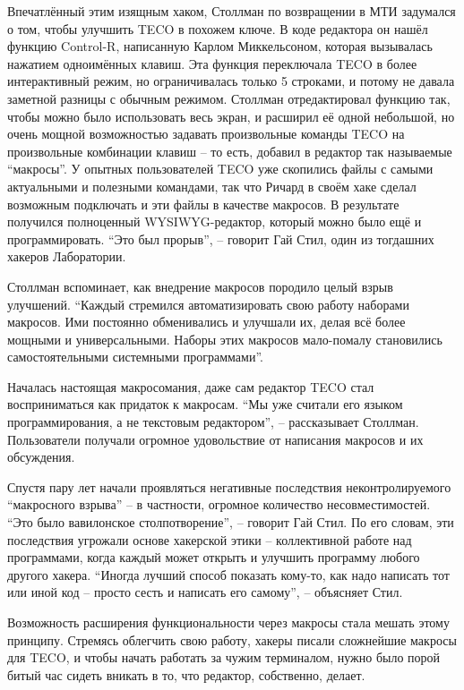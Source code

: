 Впечатлённый этим изящным хаком, Столлман по возвращении в МТИ задумался о том, чтобы улучшить TECO в похожем ключе. В коде редактора он нашёл функцию Control-R, написанную Карлом Миккельсоном, которая вызывалась нажатием одноимённых клавиш. Эта функция переключала TECO в более интерактивный режим, но ограничивалась только 5 строками, и потому не давала заметной разницы с обычным режимом. Столлман отредактировал функцию так, чтобы можно было использовать весь экран, и расширил её одной небольшой, но очень мощной возможностью задавать произвольные команды TECO на произвольные комбинации клавиш -- то есть, добавил в редактор так называемые \enquote{макросы}. У опытных пользователей TECO уже скопились файлы с самыми актуальными и полезными командами, так что Ричард в своём хаке сделал возможным подключать и эти файлы в качестве макросов. В результате получился полноценный WYSIWYG-редактор, который можно было ещё и программировать. \enquote{Это был прорыв}, -- говорит Гай Стил, один из тогдашних хакеров Лаборатории. 

Столлман вспоминает, как внедрение макросов породило целый взрыв улучшений. \enquote{Каждый стремился автоматизировать свою работу наборами макросов. Ими постоянно обменивались и улучшали их, делая всё более мощными и универсальными. Наборы этих макросов мало-помалу становились самостоятельными системными программами}.

Началась настоящая макросомания, даже сам редактор TECO стал восприниматься как придаток к макросам. \enquote{Мы уже считали его языком программирования, а не текстовым редактором}, -- рассказывает Столлман. Пользователи получали огромное удовольствие от написания макросов и их обсуждения. 

Спустя пару лет начали проявляться негативные последствия неконтролируемого \enquote{макросного взрыва} -- в частности, огромное количество несовместимостей. \enquote{Это было вавилонское столпотворение}, -- говорит Гай Стил. По его словам, эти последствия угрожали основе хакерской этики -- коллективной работе над программами, когда каждый может открыть и улучшить программу любого другого хакера. \enquote{Иногда лучший способ показать кому-то, как надо написать тот или иной код -- просто сесть и написать его самому}, -- объясняет Стил.

Возможность расширения функциональности через макросы стала мешать этому принципу. Стремясь облегчить свою работу, хакеры писали сложнейшие макросы для TECO, и чтобы начать работать за чужим терминалом, нужно было порой битый час сидеть вникать в то, что редактор, собственно, делает.

